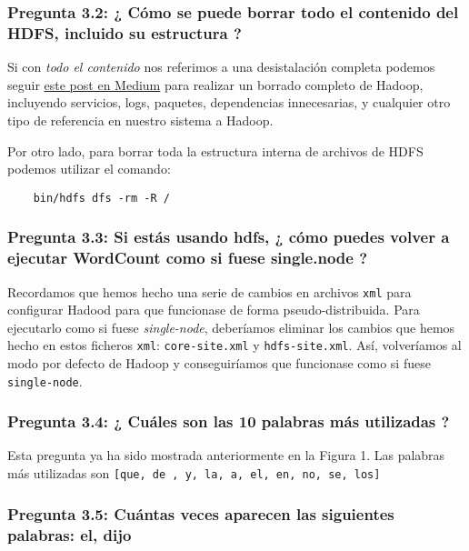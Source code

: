 \documentclass[11pt]{article}
\def\inline{\lstinline[basicstyle=\ttfamily,keywordstyle={}]}
\begin{document}
\subsubsection*{ Pregunta 3.2: ¿ Cómo se puede borrar todo el contenido del HDFS, incluido su estructura ?}

Si con \emph{todo el contenido} nos referimos a una desistalación completa podemos seguir \href{https://medium.com/@deepeshtripathi/completely-uninstall-and-delete-hadoop-from-hosts-hortonworks-1a3f755afa20}{este post en Medium} para realizar un borrado completo de Hadoop, incluyendo servicios, logs, paquetes, dependencias innecesarias, y cualquier otro tipo de referencia en nuestro sistema a Hadoop.

Por otro lado, para borrar toda la estructura interna de archivos de HDFS podemos utilizar el comando:

\begin{verbatim}
	bin/hdfs dfs -rm -R /
\end{verbatim}

\subsubsection*{ Pregunta 3.3: Si estás usando hdfs, ¿ cómo puedes volver a ejecutar WordCount como si fuese single.node ? }

Recordamos que hemos hecho una serie de cambios en archivos \inline{xml} para configurar Hadood para que funcionase de forma pseudo-distribuida. Para ejecutarlo como si fuese \emph{single-node}, deberíamos eliminar los cambios que hemos hecho en estos ficheros \inline{xml}: \inline{core-site.xml} y \inline{hdfs-site.xml}. Así, volveríamos al modo por defecto de Hadoop y conseguiríamos que funcionase como si fuese \inline{single-node}.

\subsubsection*{ Pregunta 3.4: ¿ Cuáles son las 10 palabras más utilizadas ? }

Esta pregunta ya ha sido mostrada anteriormente en la Figura 1. Las palabras más utilizadas son \inline{[que, de , y, la, a, el, en, no, se, los]}

\subsubsection*{ Pregunta 3.5: Cuántas veces aparecen las siguientes palabras: el, dijo }
\end{document}
